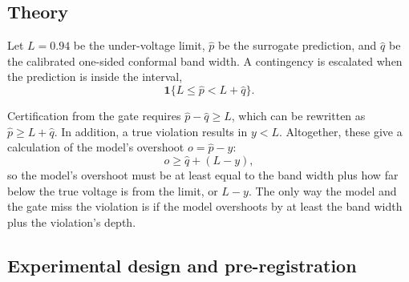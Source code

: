 \documentclass[12pt]{article}
\begin{document}
\subsection{Theory}\label{subsec:theory}

Let $L=0.94$ be the under-voltage limit, $\hat{p}$ be the surrogate prediction, and $\hat{q}$ be the calibrated one-sided conformal band width. A contingency is escalated when the prediction is inside the interval,
\begin{equation}
\mathbf{1}\{L \le \hat{p} < L + \hat{q}\}.
\end{equation}

Certification from the gate requires $\hat{p} - \hat{q} \ge L$, which can be rewritten as $\hat{p} \ge L + \hat{q}$. In addition, a true violation results in $y < L$. Altogether, these give a calculation of the model's overshoot $o = \hat{p} - y$:
\begin{equation}
o \ge \hat{q} + (L - y),
\end{equation}
so the model's overshoot must be at least equal to the band width plus how far below the true voltage is from the limit, or $L - y$. The only way the model and the gate miss the violation is if the model overshoots by at least the band width plus the violation's depth.


\subsection{Experimental design and pre-registration}
\label{subsec:prereg}
\end{document}
